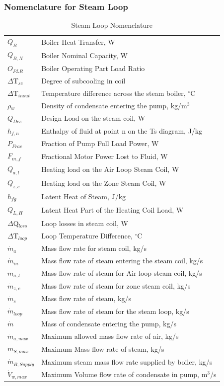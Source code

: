 \subsubsection{Nomenclature for Steam Loop}\label{nomenclature-for-steam-loop}

\begin{longtable}[c]{p{1.0in}p{4.0in}}
\caption{Steam Loop Nomenclature \label{table:steam-loop-nomenclature}} \tabularnewline
\toprule 
\endfirsthead

\caption[]{Steam Loop Nomenclature} \tabularnewline
\toprule 
\endhead

\({Q_{B}}\) & Boiler Heat Transfer, W \tabularnewline
\({Q_{B,N}}\) & Boiler Nominal Capacity, W \tabularnewline
\({O_{PLR}}\) & Boiler Operating Part Load Ratio \tabularnewline
\(\Delta\)T\(_{sc}\) & Degree of subcooling in coil \tabularnewline
\(\Delta\)T\(_{inout}\) & Temperature difference across the steam boiler, \(^{\circ}\)C \tabularnewline
\(\rho\)\(_{w}\) & Density of condensate entering the pump, kg/m\(^3\) \tabularnewline
\(Q_{Des}\) & Design Load on the steam coil, W \tabularnewline
\(h_{f,n}\) & Enthalpy of fluid at point n on the Ts diagram, J/kg \tabularnewline
\(P_{Frac}\) & Fraction of Pump Full Load Power, W \tabularnewline
\(F_{m,f}\) & Fractional Motor Power Lost to Fluid, W \tabularnewline
\(Q_{a,l}\) & Heating load on the Air Loop Steam Coil, W \tabularnewline
\(Q_{z,c}\) & Heating load on the Zone Steam Coil, W \tabularnewline
\(h_{fg}\) & Latent Heat of Steam, J/kg \tabularnewline
\(Q_{L,H}\) & Latent Heat Part of the Heating Coil Load, W \tabularnewline
\(\Delta\)Q\(_{loss}\) & Loop losses in steam coil, W \tabularnewline
\(\Delta\)T\(_{loop}\) & Loop Temperature Difference, \(^{\circ}\)C \tabularnewline
\(\dot m_{a}\) & Mass flow rate for steam coil, kg/s \tabularnewline
\(\dot m_{in}\) & Mass flow rate of steam entering the steam coil, kg/s \tabularnewline
\(\dot m_{a,l}\) & Mass flow rate of steam for Air loop steam coil, kg/s \tabularnewline
\(\dot m_{z,c}\) & Mass flow rate of steam for zone steam coil, kg/s \tabularnewline
\(\dot m_{s}\) & Mass flow rate of steam, kg/s \tabularnewline
\(\dot m_{loop}\) & Mass flow rate of steam for the steam loop, kg/s \tabularnewline
\(\dot m\) & Mass of condensate entering the pump, kg/s \tabularnewline
\(\dot m_{a,max}\) & Maximum allowed mass flow rate of air, kg/s \tabularnewline
\(\dot m_{S,max}\) & Maximum Mass flow rate of steam, kg/s \tabularnewline
\(\dot m_{B,Supply}\) & Maximum steam mass flow rate supplied by boiler, kg/s \tabularnewline
\(\dot V_{w,max}\) & Maximum Volume flow rate of condensate in pump, m\(^3\)/s \tabularnewline

\end{longtable}
